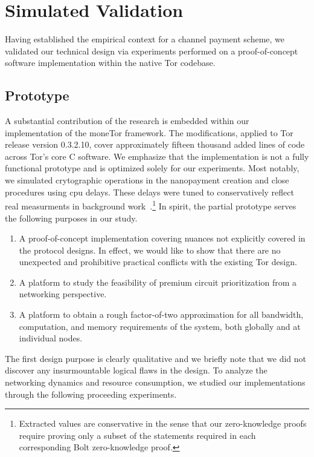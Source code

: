 \section{Simulated Validation}

Having established the empirical context for a channel payment scheme, we
validated our technical design via experiments performed on a proof-of-concept
software implementation within the native Tor codebase.

\subsection{Prototype}

A substantial contribution of the research is embedded within our implementation
of the moneTor framework. The modifications, applied to Tor release version
0.3.2.10, cover approximately fifteen thousand added lines of code across Tor's
core C software. We emphasize that the implementation is not a fully functional
prototype and is optimized solely for our experiments. Most notably, we
simulated crytographic operations in the nanopayment creation and close
procedures using cpu delays. These delays were tuned to conservatively reflect
real measurments in background work~\cite{green2017bolt}.\footnote{Extracted
  values are conservative in the sense that our zero-knowledge proofs require
  proving only a subset of the statements required in each corresponding Bolt
  zero-knowledge proof.}  In spirit, the partial prototype serves the following
purposes in our study.

\begin{enumerate}
\item A proof-of-concept implementation covering nuances not explicitly
  covered in the protocol designs. In effect, we would like to show that there
  are no unexpected and prohibitive practical conflicts with the existing Tor
  design.
\item A platform to study the feasibility of premium circuit
  prioritization from a networking perspective.
\item A platform to obtain a rough factor-of-two approximation for all
  bandwidth, computation, and memory requirements of the system, both globally
  and at individual nodes.
\end{enumerate}

The first design purpose is clearly qualitative and we briefly note that we did
not discover any insurmountable logical flaws in the design. To analyze the
networking dynamics and resource consumption, we studied our implementations
through the following proceeding experiments.

